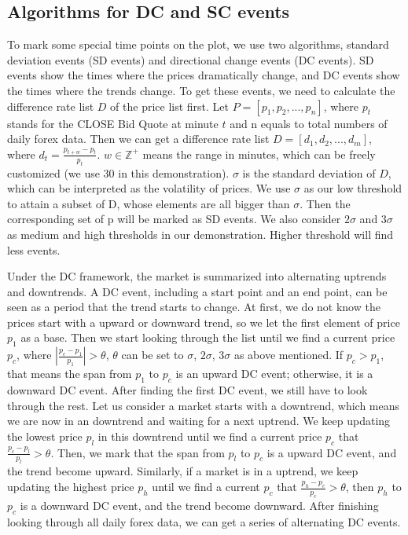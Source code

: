 \documentclass[sigconf]{acmart}
\begin{document}
\subsection{Algorithms for DC and SC events}
To mark some special time points on the plot, we use two algorithms, standard deviation events (SD events) and directional change events (DC events)\cite{7850020}. SD events show the times where the prices dramatically change, and DC events show the times where the trends change. To get these events, we need to calculate the difference rate list $D$ of the price list first. 
Let $P= [p_1, p_2, ..., p_n]$, where $p_t$ stands for the CLOSE Bid Quote at minute $t$ and n equals to total numbers of daily forex data. Then we can get a difference rate list $D= [d_1, d_2, ..., d_m]$, where $d_t = \frac{p_{t+w}-p_t}{p_t}$.  $w\in\mathbb Z^+$ means the range in minutes, which can be freely customized (we use 30 in this demonstration).
$\sigma$ is the standard deviation of $D$, which can be interpreted as the volatility of prices. We use $\sigma$ as our low threshold to attain a subset of D, whose elements are all bigger than $\sigma$. Then the corresponding set of p will be marked as SD events. We also consider $2\sigma$ and $3\sigma$ as medium and high thresholds in our demonstration. Higher threshold will find less events.

Under the DC framework, the market is summarized into alternating uptrends and downtrends\cite{7850020}. A DC event, including a start point and an end point, can be seen as a period that the trend starts to change. At first, we do not know the prices start with a upward or downward trend, so we let the first element of price $p_1$ as a base. Then we start looking through the list until we find a current price $p_c$, where $|\frac{p_c-p_1}{p_1}| > \theta$, $\theta$ can be set to $\sigma$, $2\sigma$, $3\sigma$ as above mentioned. If $p_c > p_1$, that means the span from $p_1$ to $p_c$ is an upward DC event; otherwise, it is a downward DC event. After finding the first DC event, we still have to look through the rest. Let us consider a market starts with a downtrend, which means we are now in an downtrend and waiting for a next uptrend. We keep updating the lowest price $p_l$ in this downtrend until we find a current price $p_c$ that $\frac{p_c-p_l}{p_l} > \theta$. Then, we mark that the span from $p_l$ to $p_c$ is a upward DC event, and the trend become upward. Similarly, if a market is in a uptrend, we keep updating the highest price $p_h$ until we find a current $p_c$ that $\frac{p_h-p_c}{p_c} > \theta$, then $p_h$ to $p_c$ is a downward DC event, and the trend become downward. After finishing looking through all daily forex data, we can get a series of alternating DC events.
\end{document}
